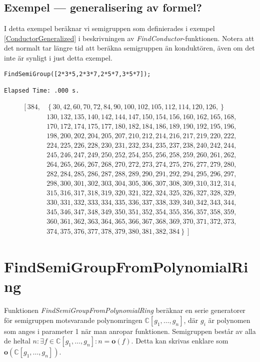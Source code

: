 \subsection{Exempel --- generalisering av formel?}

I detta exempel beräknar vi semigruppen som definierades i exempel \ref{ConductorGeneralized} i beskrivningen av \emph{FindConductor}-funktionen. Notera att det normalt tar längre tid att beräkna semigruppen än konduktören, även om det inte är synligt i just detta exempel.

\begin{verbatim}
FindSemiGroup([2*3*5,2*3*7,2*5*7,3*5*7]);

Elapsed Time: .000 s.
\end{verbatim}
\[
\begin{array}{ll}
\left[384\right., & \left\{30, 42, 60, 70, 72, 84, 90, 100, 102, 105, 112, 114, 120, 126,\right\}\\
&	130, 132, 135, 140, 142, 144, 147, 150, 154, 156, 160, 162, 165, 168,\\
&	170, 172, 174, 175, 177, 180, 182, 184, 186, 189, 190, 192, 195, 196,\\
&	198, 200, 202, 204, 205, 207, 210, 212, 214, 216, 217, 219, 220, 222,\\
&	224, 225, 226, 228, 230, 231, 232, 234, 235, 237, 238, 240, 242, 244,\\
&	245, 246, 247, 249, 250, 252, 254, 255, 256, 258, 259, 260, 261, 262,\\
&	264, 265, 266, 267, 268, 270, 272, 273, 274, 275, 276, 277, 279, 280,\\
&	282, 284, 285, 286, 287, 288, 289, 290, 291, 292, 294, 295, 296, 297,\\
&	298, 300, 301, 302, 303, 304, 305, 306, 307, 308, 309, 310, 312, 314,\\
&	315, 316, 317, 318, 319, 320, 321, 322, 324, 325, 326, 327, 328, 329,\\
&	330, 331, 332, 333, 334, 335, 336, 337, 338, 339, 340, 342, 343, 344,\\
&	345, 346, 347, 348, 349, 350, 351, 352, 354, 355, 356, 357, 358, 359,\\
&	360, 361, 362, 363, 364, 365, 366, 367, 368, 369, 370, 371, 372, 373,\\
&	\left.\left.374, 375, 376, 377, 378, 379, 380, 381, 382, 384\right\}\right]
\end{array}
\]

\section{FindSemiGroupFromPolynomialRing}
\label{FindSemiGroupFromPolynomialRing}
Funktionen \emph{FindSemiGroupFromPolynomialRing} beräknar en serie generatorer för semigruppen motsvarande polynomringen $\mathbb{C}\left[g_1, \ldots, g_n\right]$, där $g_i$ är polynomen som anges i parameter 1 när man anropar funktionen. Semigruppen består av alla de heltal $n : \exists f \in \mathbb{C}\left[g_1, \ldots, g_n\right] : n = \mathbf{o}(f)$. Detta kan skrivas enklare som $\mathbf{o}(\mathbb{C}\left[g_1, \ldots, g_n\right])$.

